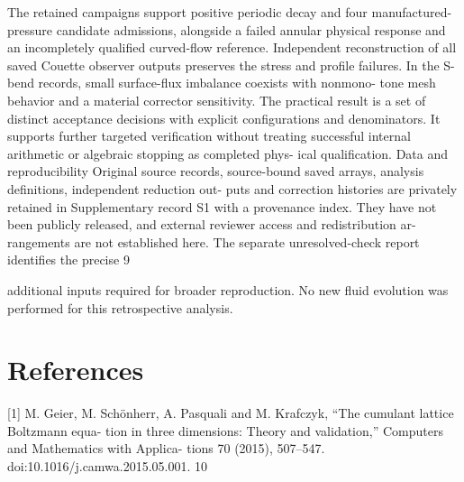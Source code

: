 \documentclass[11pt]{article}
\begin{document}
The retained campaigns support positive periodic decay and four manufactured-pressure candidate
admissions, alongside a failed annular physical response and an incompletely qualified curved-flow
reference. Independent reconstruction of all saved Couette observer outputs preserves the stress
and profile failures. In the S-bend records, small surface-flux imbalance coexists with nonmono-
tone mesh behavior and a material corrector sensitivity. The practical result is a set of distinct
acceptance decisions with explicit configurations and denominators. It supports further targeted
verification without treating successful internal arithmetic or algebraic stopping as completed phys-
ical qualification.
Data and reproducibility
Original source records, source-bound saved arrays, analysis definitions, independent reduction out-
puts and correction histories are privately retained in Supplementary record S1 with a provenance
index. They have not been publicly released, and external reviewer access and redistribution ar-
rangements are not established here. The separate unresolved-check report identifies the precise
9

additional inputs required for broader reproduction. No new fluid evolution was performed for this
retrospective analysis.

\section*{References}

[1] M. Geier, M. Schönherr, A. Pasquali and M. Krafczyk, “The cumulant lattice Boltzmann equa-
tion in three dimensions: Theory and validation,” Computers and Mathematics with Applica-
tions 70 (2015), 507–547. doi:10.1016/j.camwa.2015.05.001.
10
\end{document}
